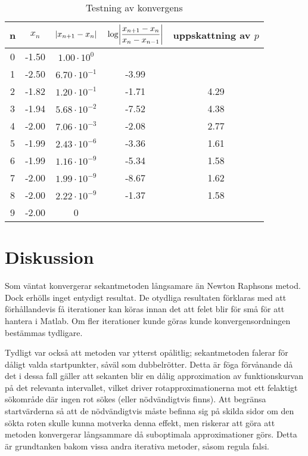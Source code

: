 \documentclass[12pt]{article}
\DeclarePairedDelimiter\abs{\lvert}{\rvert}
\begin{document}
\begin{table}[H]
  \centering
  \begin{tabu}{ c c c c c }
    n & $x_n$ & $\abs{x_{n+1}-x_n}$ & $\log\abs*{\dfrac{x_{n+1}-x_n}{x_n-x_{n-1}}}$ & uppskattning av $p$\\
     & -1.50 & $1.00 \cdot 10^0$ \\
    1 & -2.50 & $6.70 \cdot 10^{-1}$ & -3.99 & \\
    2 & -1.82 & $1.20 \cdot 10^{-1}$ & -1.71 & 4.29 \\
    3 & -1.94 & $5.68 \cdot 10^{-2}$ & -7.52 & 4.38 \\
    4 & -2.00 & $7.06 \cdot 10^{-3}$ & -2.08 & 2.77 \\
    5 & -1.99 & $2.43 \cdot 10^{-6}$ & -3.36 & 1.61 \\
    6 & -1.99 & $1.16 \cdot 10^{-9}$ & -5.34 & 1.58 \\
    7 & -2.00 & $1.99 \cdot 10^{-9}$ & -8.67 & 1.62 \\
    8 & -2.00 & $2.22 \cdot 10^{-9}$ & -1.37 & 1.58 \\
    9 & -2.00 & 0 \\
  \end{tabu}
  \caption{Testning av konvergens}\label{konvergens}
\end{table}

\section{Diskussion}
Som väntat konvergerar sekantmetoden långsamare än Newton Raphsons metod. Dock erhölls inget entydigt resultat. De otydliga resultaten förklaras med att förhållandevis få iterationer kan köras innan det att felet blir för små för att hantera i Matlab. Om fler iterationer kunde göras kunde konvergensordningen bestämmas tydligare.


Tydligt var också att metoden var ytterst opålitlig; sekantmetoden falerar för dåligt valda startpunkter, såväl som dubbelrötter. Detta är föga förvånande då det i dessa fall gäller att sekanten blir en dålig approximation av funktionskurvan på det relevanta intervallet, vilket driver rotapproximationerna mot ett felaktigt sökområde där ingen rot sökes (eller nödvändigtvis finns). Att begränsa startvärderna så att de nödvändigtvis måste befinna sig på skilda sidor om den sökta roten skulle kunna motverka denna effekt, men riskerar att göra att metoden konvergerar långsammare då suboptimala approximationer görs. Detta är grundtanken bakom vissa andra iterativa metoder, såsom regula falsi.
\end{document}
